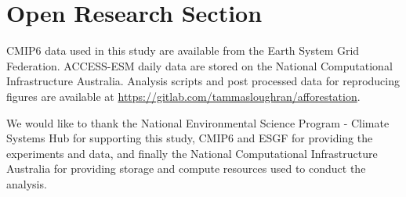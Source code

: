 \documentclass[draft]{agujournal2019}
\begin{document}
%
%

\section*{Open Research Section}
CMIP6 data used in this study are available from the Earth System Grid Federation.
ACCESS-ESM daily data are stored on the National Computational Infrastructure Australia. Analysis scripts and post processed data for reproducing figures are available at \url{https://gitlab.com/tammasloughran/afforestation}.

\acknowledgments
We would like to thank the National Environmental Science Program - Climate Systems Hub for supporting this study, CMIP6 and ESGF for providing the experiments and data, and finally the National Computational Infrastructure Australia for providing storage and compute resources used to conduct the analysis.


%
%





%
%
%
%
%
\end{document}
